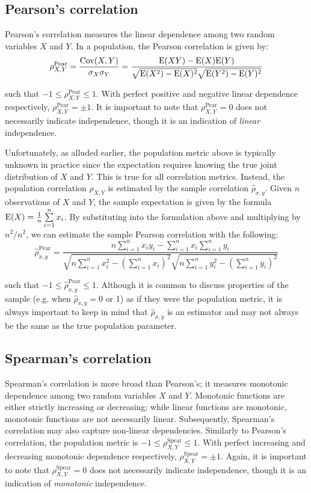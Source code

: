 \subsection{Pearson's correlation}

Pearson's correlation measures the linear dependence among two random variables
$X$ and $Y$. In a population, the Pearson correlation is given by:
$$\rho_{X,Y}^{\text{Pear}}=\frac{\mathrm{Cov}(X,Y)}{\sigma_X \sigma_Y} =
\frac{\mathrm{E}(XY)-\mathrm{E}(X)\mathrm{E}(Y)}{\sqrt{\mathrm{E}(X^2)-\mathrm{E}(X)^2} \sqrt{\mathrm{E}(Y^2)-\mathrm{E}(Y)^2}}$$ 

\noindent such that $-1 \leq \rho_{X,Y}^{\text{Pear}} \leq 1$. With perfect 
positive and negative linear 
dependence respectively, $\rho_{X,Y}^{\text{Pear}}=\pm1$.
It is important to note that $\rho_{X,Y}^{\text{Pear}}=0$ does not 
necessarily indicate independence, though it is an indication of 
\textit{linear} independence.

Unfortunately, as alluded earlier, the population metric above is typically 
unknown in practice since 
the expectation requires knowing the true joint distribution of $X$ and $Y$. 
This is true for all correlation metrics.
Instead, the population correlation $\rho_{X,Y}$ is estimated by the sample 
correlation $\hat{\rho}_{x,y}$. Given $n$ observations of $X$ and $Y$, the 
sample expectation is 
given by the formula  
$\mathrm{E}(X)=\frac{1}{n}\sum\limits_{i=1}^{n}x_i$. 
By substituting into the formulation above and multiplying by $n^2/n^2$, we can 
estimate the sample Pearson correlation with the following:
$$\hat{\rho}_{x,y}^\text{Pear}=
\frac{n \sum\limits_{i=1}^{n} x_i y_i - \sum\limits_{i=1}^{n} x_i
	\sum\limits_{i=1}^{n} y_i}
{\sqrt{n\sum\limits_{i=1}^{n} x_i^2-\left(\sum\limits_{i=1}^{n} x_i\right)^2} 
	\sqrt{n\sum\limits_{i=1}^{n} y_i^2-\left(\sum\limits_{i=1}^{n} y_i\right)^2}}$$ 

\noindent such that $-1 \leq \hat{\rho}_{x,y}^\text{Pear} \leq 1$. Although it 
is common to discuss properties of the sample (e.g. when $\hat{\rho}_{x,y} = 0$ 
or 1) as if they were the population metric, it is always important to keep in 
mind that $\hat{\rho}_{x,y}$ is an estimator and may not always be the same as 
the true population parameter.

\subsection{Spearman's correlation}

Spearman's correlation is more broad than Pearson's; it measures monotonic
dependence among two random variables $X$ and $Y$. Monotonic functions are
either strictly increasing or decreasing; while linear functions are monotonic,
monotonic functions are not necessarily linear. Subsequently, Spearman's
correlation may also capture non-linear dependencies. 
Similarly to Pearson's correlation, the population metric is $-1 \leq 
\rho_{X,Y}^{\text{Spear}} \leq 1$. With 
perfect increasing and decreasing monotonic dependence respectively,
$\rho_{X,Y}^{\text{Spear}} = \pm1$. Again, it is important to note that 
$\rho_{X,Y}^{\text{Spear}}=0$ does not necessarily indicate 
independence, though it is an indication of \textit{monotonic} independence.

